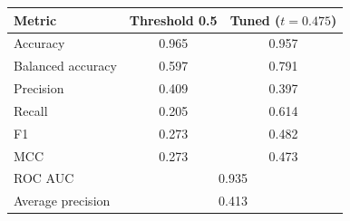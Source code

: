 \begin{tabular}{lcc}
\toprule
Metric & Threshold 0.5 & Tuned ($t = 0.475$) \\
\midrule
Accuracy & 0.965 & 0.957 \\
Balanced accuracy & 0.597 & 0.791 \\
Precision & 0.409 & 0.397 \\
Recall & 0.205 & 0.614 \\
F1 & 0.273 & 0.482 \\
MCC & 0.273 & 0.473 \\
\midrule
ROC AUC & \multicolumn{2}{c}{0.935} \\
Average precision & \multicolumn{2}{c}{0.413} \\
\bottomrule
\end{tabular}
